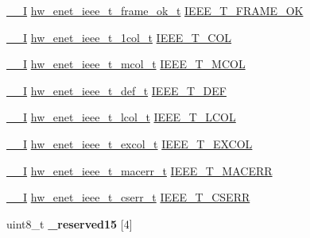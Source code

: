 \begin{DoxyCompactItemize}
\item 
\hyperlink{core__sc300_8h_af63697ed9952cc71e1225efe205f6cd3}{\+\_\+\+\_\+I} \hyperlink{union__hw__enet__ieee__t__frame__ok}{hw\+\_\+enet\+\_\+ieee\+\_\+t\+\_\+frame\+\_\+ok\+\_\+t} \hyperlink{struct__hw__enet_aacfd247b7401b3ac54009df8d94faf0b}{I\+E\+E\+E\+\_\+\+T\+\_\+\+F\+R\+A\+M\+E\+\_\+\+OK}
\item 
\hyperlink{core__sc300_8h_af63697ed9952cc71e1225efe205f6cd3}{\+\_\+\+\_\+I} \hyperlink{union__hw__enet__ieee__t__1col}{hw\+\_\+enet\+\_\+ieee\+\_\+t\+\_\+1col\+\_\+t} \hyperlink{struct__hw__enet_a9a14cd8929a871a034906f2625084181}{I\+E\+E\+E\+\_\+\+T\+\_\+C\+OL}
\item 
\hyperlink{core__sc300_8h_af63697ed9952cc71e1225efe205f6cd3}{\+\_\+\+\_\+I} \hyperlink{union__hw__enet__ieee__t__mcol}{hw\+\_\+enet\+\_\+ieee\+\_\+t\+\_\+mcol\+\_\+t} \hyperlink{struct__hw__enet_aa82bf417f5e29ec2032a2b85ea80f2c4}{I\+E\+E\+E\+\_\+\+T\+\_\+\+M\+C\+OL}
\item 
\hyperlink{core__sc300_8h_af63697ed9952cc71e1225efe205f6cd3}{\+\_\+\+\_\+I} \hyperlink{union__hw__enet__ieee__t__def}{hw\+\_\+enet\+\_\+ieee\+\_\+t\+\_\+def\+\_\+t} \hyperlink{struct__hw__enet_aff13d9609434a0c2dff18b3489831367}{I\+E\+E\+E\+\_\+\+T\+\_\+\+D\+EF}
\item 
\hyperlink{core__sc300_8h_af63697ed9952cc71e1225efe205f6cd3}{\+\_\+\+\_\+I} \hyperlink{union__hw__enet__ieee__t__lcol}{hw\+\_\+enet\+\_\+ieee\+\_\+t\+\_\+lcol\+\_\+t} \hyperlink{struct__hw__enet_ae74c2a1ac0454ec88b61c37114e5a19a}{I\+E\+E\+E\+\_\+\+T\+\_\+\+L\+C\+OL}
\item 
\hyperlink{core__sc300_8h_af63697ed9952cc71e1225efe205f6cd3}{\+\_\+\+\_\+I} \hyperlink{union__hw__enet__ieee__t__excol}{hw\+\_\+enet\+\_\+ieee\+\_\+t\+\_\+excol\+\_\+t} \hyperlink{struct__hw__enet_ab232f28f6ec54cd2e459d262b1b9134a}{I\+E\+E\+E\+\_\+\+T\+\_\+\+E\+X\+C\+OL}
\item 
\hyperlink{core__sc300_8h_af63697ed9952cc71e1225efe205f6cd3}{\+\_\+\+\_\+I} \hyperlink{union__hw__enet__ieee__t__macerr}{hw\+\_\+enet\+\_\+ieee\+\_\+t\+\_\+macerr\+\_\+t} \hyperlink{struct__hw__enet_ae95552267a671662fa63743f23dd25d5}{I\+E\+E\+E\+\_\+\+T\+\_\+\+M\+A\+C\+E\+RR}
\item 
\hyperlink{core__sc300_8h_af63697ed9952cc71e1225efe205f6cd3}{\+\_\+\+\_\+I} \hyperlink{union__hw__enet__ieee__t__cserr}{hw\+\_\+enet\+\_\+ieee\+\_\+t\+\_\+cserr\+\_\+t} \hyperlink{struct__hw__enet_a65b22140bc5c3582f7a6f61c4a3a33ee}{I\+E\+E\+E\+\_\+\+T\+\_\+\+C\+S\+E\+RR}
\item 
uint8\+\_\+t {\bfseries \+\_\+reserved15} \mbox{[}4\mbox{]}\hypertarget{struct__hw__enet_a3426d7dae5d53a6a615033a13c9bb5ce}{}\label{struct__hw__enet_a3426d7dae5d53a6a615033a13c9bb5ce}


\end{DoxyCompactItemize}
